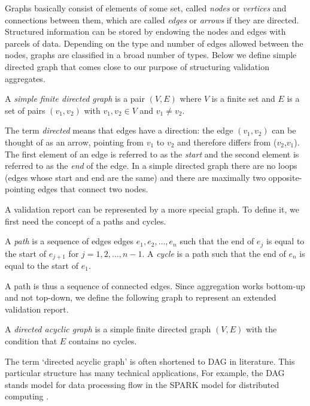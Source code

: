 Graphs basically consist of elements of some set, called \emph{nodes} or
\emph{vertices} and connections between them, which are called \emph{edges} or
\emph{arrows} if they are directed. Structured information can be stored by
endowing the nodes and edges with parcels of data.  Depending on the type and
number of edges allowed between the nodes, graphs are classified in a broad
number of types.  Below we define simple directed graph that comes close to our
purpose of structuring validation aggregates.
%
\begin{definition}
\label{def:simplegraph}
A \emph{simple finite directed graph} is a pair  $(V,E)$ where $V$ is a finite set and $E$
is a set of pairs $(v_1,v_2)$ with $v_1,v_2\in V$ and $v_1\not=v_2$.
\end{definition}
The term \emph{directed} means
that edges have a direction: the edge $(v_1,v_2)$ can be thought of as an
arrow, pointing from $v_1$ to $v_2$ and therefore differs from ($v_2$,$v_1$).
The first element of an edge is referred to as the \emph{start} and the second
element is referred to as the \emph{end} of the edge. In a simple
directed graph there are no loops (edges whose start and end are the same)
and there are maximally two opposite-pointing edges that connect two
nodes.

A validation report can be represented by a more special graph. To define it,
we first need the concept of a paths and cycles.
\begin{definition}
\label{def:pathcycle}
A \emph{path} is a sequence of edges edges $e_1,e_2,\ldots,e_n$ such that the 
end of $e_j$ is equal to the start of
$e_{j+1}$ for $j=1,2,\ldots,n-1$. A \emph{cycle} is a path such that the end of
$e_n$ is equal to the start of $e_1$.
\end{definition}
A path is thus a sequence of connected edges. Since aggregation works bottom-up
and not top-down, we define the following graph to represent an extended
validation report.
\begin{definition}
A \emph{directed acyclic graph} is a simple finite directed graph $(V,E)$ with
the condition that $E$ contains no cycles.
\end{definition}
%
The term `directed acyclic graph' is often shortened to DAG in literature. This
particular structure has many technical applications, For example, the DAG
stands model for data processing flow in the SPARK model for distributed
computing \citep{gupta2003spark}. 


